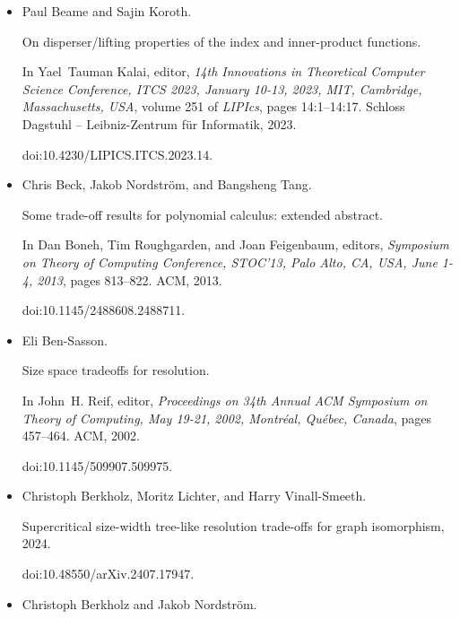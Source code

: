 \documentclass[10pt,a4paper]{article}
\begin{document}
\begin{itemize}
\item[] 
[4]

Paul Beame and Sajin Koroth.


On disperser/lifting properties of the index and inner-product
functions.


In Yael Tauman Kalai, editor, \emph{14th Innovations in Theoretical
Computer Science Conference, ITCS 2023, January 10-13, 2023, MIT,
Cambridge, Massachusetts, USA}, volume 251 of \emph{LIPIcs}, pages
14:1–14:17. Schloss Dagstuhl – Leibniz-Zentrum für Informatik, 2023.


doi:10.4230/LIPICS.ITCS.2023.14.





\item[] 
[5]

Chris Beck, Jakob Nordström, and Bangsheng Tang.


Some trade-off results for polynomial calculus: extended abstract.


In Dan Boneh, Tim Roughgarden, and Joan Feigenbaum, editors, \emph{Symposium on Theory of Computing Conference, STOC’13, Palo Alto, CA, USA,
June 1-4, 2013}, pages 813–822. ACM, 2013.


doi:10.1145/2488608.2488711.





\item[] 
[6]

Eli Ben-Sasson.


Size space tradeoffs for resolution.


In John H. Reif, editor, \emph{Proceedings on 34th Annual ACM
Symposium on Theory of Computing, May 19-21, 2002, Montréal,
Québec, Canada}, pages 457–464. ACM, 2002.


doi:10.1145/509907.509975.





\item[] 
[7]

Christoph Berkholz, Moritz Lichter, and Harry Vinall-Smeeth.


Supercritical size-width tree-like resolution trade-offs for graph
isomorphism, 2024.


doi:10.48550/arXiv.2407.17947.





\item[] 
[8]

Christoph Berkholz and Jakob Nordström.



\end{itemize}
\end{document}
